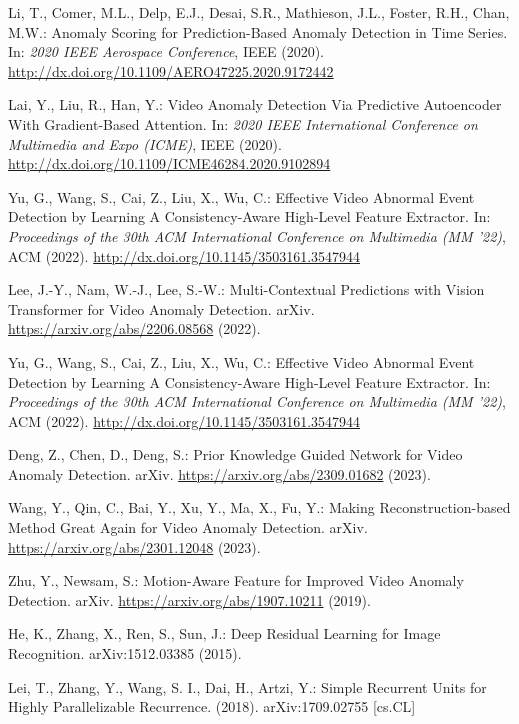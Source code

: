\begin{thebibliography}{99}
Li, T., Comer, M.L., Delp, E.J., Desai, S.R., Mathieson, J.L., Foster, R.H., Chan, M.W.: Anomaly Scoring for Prediction-Based Anomaly Detection in Time Series. In: \textit{2020 IEEE Aerospace Conference}, IEEE (2020). \url{http://dx.doi.org/10.1109/AERO47225.2020.9172442}

Lai, Y., Liu, R., Han, Y.: Video Anomaly Detection Via Predictive Autoencoder With Gradient-Based Attention. In: \textit{2020 IEEE International Conference on Multimedia and Expo (ICME)}, IEEE (2020). \url{http://dx.doi.org/10.1109/ICME46284.2020.9102894}

Yu, G., Wang, S., Cai, Z., Liu, X., Wu, C.: Effective Video Abnormal Event Detection by Learning A Consistency-Aware High-Level Feature Extractor. In: \textit{Proceedings of the 30th ACM International Conference on Multimedia (MM '22)}, ACM (2022). \url{http://dx.doi.org/10.1145/3503161.3547944}

Lee, J.-Y., Nam, W.-J., Lee, S.-W.: Multi-Contextual Predictions with Vision Transformer for Video Anomaly Detection. arXiv. \url{https://arxiv.org/abs/2206.08568} (2022). 

Yu, G., Wang, S., Cai, Z., Liu, X., Wu, C.: Effective Video Abnormal Event Detection by Learning A Consistency-Aware High-Level Feature Extractor. In: \textit{Proceedings of the 30th ACM International Conference on Multimedia (MM '22)}, ACM (2022). \url{http://dx.doi.org/10.1145/3503161.3547944}

Deng, Z., Chen, D., Deng, S.: Prior Knowledge Guided Network for Video Anomaly Detection. arXiv. \url{https://arxiv.org/abs/2309.01682} (2023). 

Wang, Y., Qin, C., Bai, Y., Xu, Y., Ma, X., Fu, Y.: Making Reconstruction-based Method Great Again for Video Anomaly Detection. arXiv. \url{https://arxiv.org/abs/2301.12048} (2023). 

Zhu, Y., Newsam, S.: Motion-Aware Feature for Improved Video Anomaly Detection. arXiv. \url{https://arxiv.org/abs/1907.10211} (2019). 

He, K., Zhang, X., Ren, S., Sun, J.: Deep Residual Learning for Image Recognition. arXiv:1512.03385 (2015).

Lei, T., Zhang, Y., Wang, S. I., Dai, H., Artzi, Y.: Simple Recurrent Units for Highly Parallelizable Recurrence. (2018). arXiv:1709.02755 [cs.CL]


\end{thebibliography}
